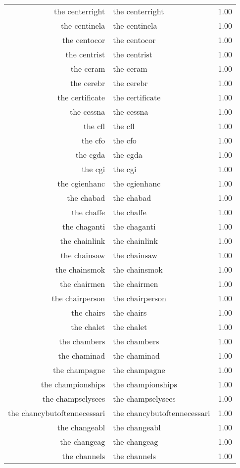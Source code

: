 \begin{table}[ht]
\begin{tabular}{rlr}
  the centerright & the centerright & 1.00 \\ 
  the centinela & the centinela & 1.00 \\ 
  the centocor & the centocor & 1.00 \\ 
  the centrist & the centrist & 1.00 \\ 
  the ceram & the ceram & 1.00 \\ 
  the cerebr & the cerebr & 1.00 \\ 
  the certificate & the certificate & 1.00 \\ 
  the cessna & the cessna & 1.00 \\ 
  the cfl & the cfl & 1.00 \\ 
  the cfo & the cfo & 1.00 \\ 
  the cgda & the cgda & 1.00 \\ 
  the cgi & the cgi & 1.00 \\ 
  the cgienhanc & the cgienhanc & 1.00 \\ 
  the chabad & the chabad & 1.00 \\ 
  the chaffe & the chaffe & 1.00 \\ 
  the chaganti & the chaganti & 1.00 \\ 
  the chainlink & the chainlink & 1.00 \\ 
  the chainsaw & the chainsaw & 1.00 \\ 
  the chainsmok & the chainsmok & 1.00 \\ 
  the chairmen & the chairmen & 1.00 \\ 
  the chairperson & the chairperson & 1.00 \\ 
  the chairs & the chairs & 1.00 \\ 
  the chalet & the chalet & 1.00 \\ 
  the chambers & the chambers & 1.00 \\ 
  the chaminad & the chaminad & 1.00 \\ 
  the champagne & the champagne & 1.00 \\ 
  the championships & the championships & 1.00 \\ 
  the champselysees & the champselysees & 1.00 \\ 
  the chancybutoftennecessari & the chancybutoftennecessari & 1.00 \\ 
  the changeabl & the changeabl & 1.00 \\ 
  the changeag & the changeag & 1.00 \\ 
  the channels & the channels & 1.00 \\ 

\end{tabular}
\end{table}
